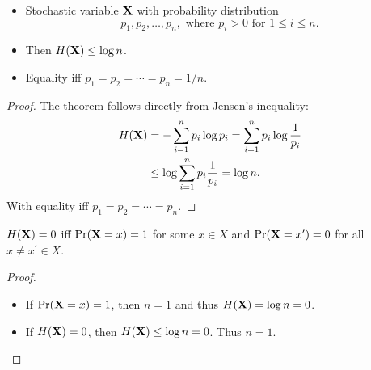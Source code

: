 \begin{frame}
  \begin{theorem}
    \begin{itemize}
      \item Stochastic variable \(\mathbf X\) with probability distribution 
        \begin{equation*}
          p_1, p_2,\ldots, p_n, \text{ where } p_i > 0 \text{ for } 1\leq i\leq 
          n.
        \end{equation*}
      \item Then \(H(\mathbf X)\leq \log n\).
      \item Equality iff \(p_1 = p_2 = \cdots = p_n = 1/n\).
    \end{itemize}
  \end{theorem}
\end{frame}

\begin{frame}
  \begin{proof}
    The theorem follows directly from Jensen's inequality:
    \begin{align*}
      H(\mathbf X) &= -\sum_{i=1}^n p_i\log p_i = \sum_{i=1}^n 
      p_i\log\frac{1}{p_i} \\
      &\leq \log\sum_{i=1}^n p_i\frac{1}{p_i} = \log n.
    \end{align*}
    With equality iff \(p_1 = p_2 = \cdots = p_n\).
  \end{proof}
\end{frame}

\begin{frame}
  \begin{corollary}
    \(H(\mathbf X) = 0\) iff \(\Pr(\mathbf X = x) = 1\) for some \(x\in X\) and 
    \(\Pr(\mathbf X = x^\prime) = 0\) for all \(x\neq x^\prime \in X\).
  \end{corollary}

  \begin{proof}
    \begin{itemize}
      \item If \(\Pr(\mathbf X = x) = 1\), then \(n = 1\) and thus \(H(\mathbf X) 
          = \log n = 0\).

      \item If \(H(\mathbf X) = 0\), then \(H(\mathbf X) \leq \log n = 0\).
        Thus \(n = 1\).
    \end{itemize}
  \end{proof}
\end{frame}

